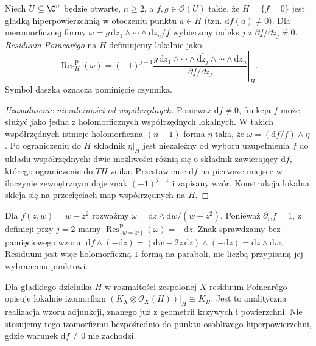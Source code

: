 \begin{definicja}
\label{def:ga4-poincare-res}
Niech $U\subseteq\C^n$ będzie otwarte, $n\ge2$, a
$f,g\in\mathcal O(U)$ takie, że $H=\{f=0\}$ jest
gładką hiperpowierzchnią w otoczeniu punktu $a\in H$
(tzn. $\mathrm df(a)\ne0$). Dla meromorficznej formy
$\omega=g\,\mathrm dz_1\wedge\cdots\wedge\mathrm dz_n/f$
wybierzmy indeks $j$ z $\partial f/\partial z_j\ne0$.
\emph{Residuum Poincarégo} na $H$ definiujemy lokalnie jako
\[
\operatorname{Res}_H^{\mathrm P}(\omega)
=\left.(-1)^{j-1}\frac{g\,\mathrm dz_1\wedge\cdots
\wedge\widehat{\mathrm dz_j}\wedge\cdots\wedge\mathrm dz_n}
{\partial f/\partial z_j}\right|_H.
\]
Symbol daszka oznacza pominięcie czynnika.
\end{definicja}
\begin{proof}[Uzasadnienie niezależności od współrzędnych]
Ponieważ $\mathrm df\ne0$, funkcja $f$ może służyć
jako jedna z holomorficznych współrzędnych lokalnych.
W takich współrzędnych istnieje holomorficzna $(n-1)$-forma
$\eta$ taka, że $\omega=(\mathrm df/f)\wedge\eta$.
Po ograniczeniu do $H$ składnik $\eta|_H$ jest
niezależny od wyboru uzupełnienia $f$ do układu
współrzędnych: dwie możliwości różnią się o składnik
zawierający $\mathrm df$, którego ograniczenie do $TH$
znika. Przestawienie $\mathrm df$ na pierwsze miejsce
w iloczynie zewnętrznym daje znak $(-1)^{j-1}$
i zapisany wzór. Konstrukcja lokalna skleja się na
przecięciach map współrzędnych na $H$.
\end{proof}

\begin{przyklad}
Dla $f(z,w)=w-z^2$ rozważmy
$\omega=\mathrm dz\wedge\mathrm dw/(w-z^2)$.
Ponieważ $\partial_w f=1$, z definicji przy $j=2$ mamy
$\operatorname{Res}^{\mathrm P}_{\{w=z^2\}}(\omega)=-\mathrm dz$.
Znak sprawdzamy bez pamięciowego wzoru:
$\mathrm df\wedge(-\mathrm dz)
=(\mathrm dw-2z\,\mathrm dz)\wedge(-\mathrm dz)
=\mathrm dz\wedge\mathrm dw$.
Residuum jest więc holomorficzną $1$-formą na paraboli,
nie liczbą przypisaną jej wybranemu punktowi.
\end{przyklad}

\begin{uwaga}
Dla gładkiego dzielnika $H$ w rozmaitości zespolonej $X$
residuum Poincarégo opisuje lokalnie izomorfizm
$(K_X\otimes\mathcal O_X(H))|_H\cong K_H$.
Jest to analityczna realizacja wzoru adjunkcji,
znanego już z geometrii krzywych i powierzchni.
Nie stosujemy tego izomorfizmu bezpośrednio do punktu
osobliwego hiperpowierzchni, gdzie warunek $\mathrm df\ne0$
nie zachodzi.
\end{uwaga}

